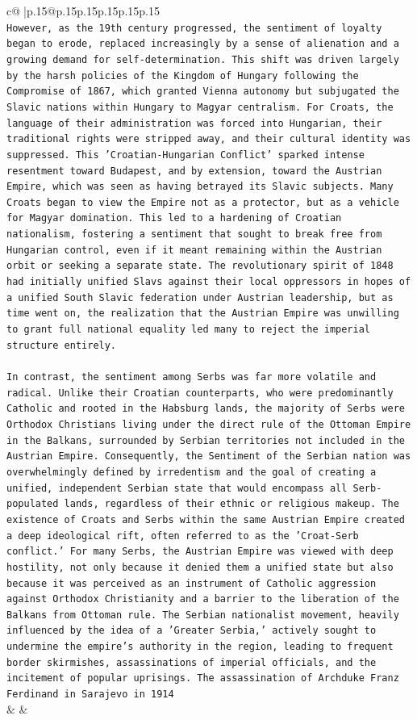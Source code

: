 \documentclass{article}
\begin{document}
{\begin{supertabular}{c@{$\;$}|p{.15\linewidth}@{}p{.15\linewidth}p{.15\linewidth}p{.15\linewidth}p{.15\linewidth}p{.15\linewidth}}
{{{\\ 
\texttt{However, as the 19th century progressed, the sentiment of loyalty began to erode, replaced increasingly by a sense of alienation and a growing demand for self{-}determination. This shift was driven largely by the harsh policies of the Kingdom of Hungary following the Compromise of 1867, which granted Vienna autonomy but subjugated the Slavic nations within Hungary to Magyar centralism. For Croats, the language of their administration was forced into Hungarian, their traditional rights were stripped away, and their cultural identity was suppressed. This 'Croatian{-}Hungarian Conflict' sparked intense resentment toward Budapest, and by extension, toward the Austrian Empire, which was seen as having betrayed its Slavic subjects. Many Croats began to view the Empire not as a protector, but as a vehicle for Magyar domination. This led to a hardening of Croatian nationalism, fostering a sentiment that sought to break free from Hungarian control, even if it meant remaining within the Austrian orbit or seeking a separate state. The revolutionary spirit of 1848 had initially unified Slavs against their local oppressors in hopes of a unified South Slavic federation under Austrian leadership, but as time went on, the realization that the Austrian Empire was unwilling to grant full national equality led many to reject the imperial structure entirely.} \\
\\ 
\texttt{In contrast, the sentiment among Serbs was far more volatile and radical. Unlike their Croatian counterparts, who were predominantly Catholic and rooted in the Habsburg lands, the majority of Serbs were Orthodox Christians living under the direct rule of the Ottoman Empire in the Balkans, surrounded by Serbian territories not included in the Austrian Empire. Consequently, the Sentiment of the Serbian nation was overwhelmingly defined by irredentism and the goal of creating a unified, independent Serbian state that would encompass all Serb{-}populated lands, regardless of their ethnic or religious makeup. The existence of Croats and Serbs within the same Austrian Empire created a deep ideological rift, often referred to as the 'Croat{-}Serb conflict.' For many Serbs, the Austrian Empire was viewed with deep hostility, not only because it denied them a unified state but also because it was perceived as an instrument of Catholic aggression against Orthodox Christianity and a barrier to the liberation of the Balkans from Ottoman rule. The Serbian nationalist movement, heavily influenced by the idea of a 'Greater Serbia,' actively sought to undermine the empire's authority in the region, leading to frequent border skirmishes, assassinations of imperial officials, and the incitement of popular uprisings. The assassination of Archduke Franz Ferdinand in Sarajevo in 1914} \\
            }
        }
    }
    & & \\ \\


\end{supertabular}}
\end{document}
